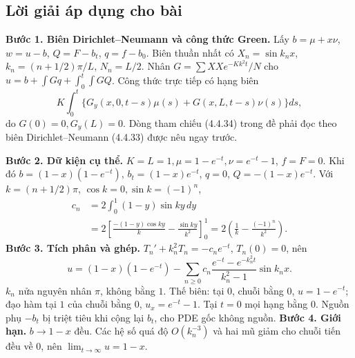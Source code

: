 \documentclass[10pt,a4paper]{article}
\begin{document}
\subsection*{Lời giải áp dụng cho bài}
\textbf{Bước 1. Biên Dirichlet–Neumann và công thức Green.}
Lấy $b=\mu+x\nu$, $w=u-b$, $Q=F-b_t$, $q=f-b_0$. Biên thuần nhất có $X_n=\sin k_nx$, $k_n=(n+1/2)\pi/L$, $N_n=L/2$. Nhân $G=\sum XXe^{-Kk^2t}/N$ cho $u=b+\int Gq+\int_0^t\int GQ$. Công thức trực tiếp có hạng biên
\[K\int_0^t\{G_y(x,0,t-s)\mu(s)+G(x,L,t-s)\nu(s)\}ds,\]
do $G(0)=0,G_y(L)=0$. Dòng tham chiếu (4.4.34) trong đề phải đọc theo biên Dirichlet–Neumann (4.4.33) được nêu ngay trước.

\textbf{Bước 2. Dữ kiện cụ thể.}
$K=L=1,\mu=1-e^{-t},\nu=e^{-t}-1$, $f=F=0$. Khi đó $b=(1-x)(1-e^{-t})$, $b_t=(1-x)e^{-t}$, $q=0$, $Q=-(1-x)e^{-t}$.
Với $k=(n+1/2)\pi$, $\cos k=0,\sin k=(-1)^n$,
\begin{align*}
c_n&=2\int_0^1(1-y)\sin ky\,dy\\
&=2\left[\frac{-(1-y)\cos ky}k-\frac{\sin ky}{k^2}\right]_0^1
=2\left(\frac1k-\frac{(-1)^n}{k^2}\right).
\end{align*}
\textbf{Bước 3. Tích phân và ghép.}
$T_n'+k_n^2T_n=-c_ne^{-t}$, $T_n(0)=0$, nên
\[u=(1-x)(1-e^{-t})
-\sum_{n\ge0}c_n\frac{e^{-t}-e^{-k_n^2t}}{k_n^2-1}\sin k_nx.\]
$k_n$ nửa nguyên nhân $\pi$, không bằng $1$. Thế biên: tại $0$, chuỗi bằng $0$, $u=1-e^{-t}$; đạo hàm tại $1$ của chuỗi bằng $0$, $u_x=e^{-t}-1$. Tại $t=0$ mọi hạng bằng $0$. Nguồn phụ $-b_t$ bị triệt tiêu khi cộng lại $b_t$, cho PDE gốc không nguồn.
\textbf{Bước 4. Giới hạn.} $b\to1-x$ đều. Các hệ số quá độ $O(k_n^{-3})$ và hai mũ giảm cho chuỗi tiến đều về $0$, nên $\lim_{t\to\infty}u=1-x$.
\end{document}

